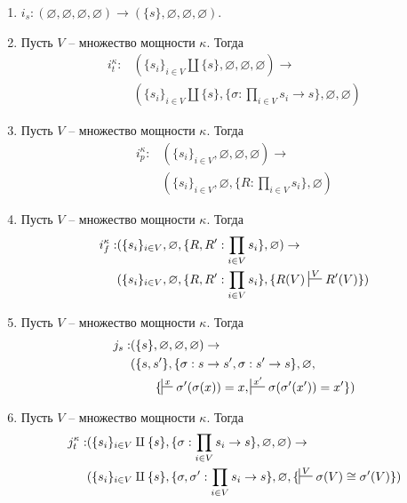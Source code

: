 \documentclass[reqno]{amsart}
\theoremstyle{definition}
\theoremstyle{remark}
\begin{document}
\begin{enumerate}
\item $i_s : (\varnothing,\varnothing,\varnothing,\varnothing) \to (\{ s \},\varnothing,\varnothing,\varnothing)$.
\item Пусть $V$ -- множество мощности $\kappa$. Тогда
\begin{align*}
i_t^\kappa : & (\{ s_i \}_{i \in V} \amalg \{ s \}, \varnothing, \varnothing, \varnothing) \to \\
             & (\{ s_i \}_{i \in V} \amalg \{ s \}, \{ \sigma : \prod_{i \in V} s_i \to s \}, \varnothing, \varnothing)
\end{align*}
\item Пусть $V$ -- множество мощности $\kappa$. Тогда
\begin{align*}
i_p^\kappa : & (\{ s_i \}_{i \in V}, \varnothing, \varnothing, \varnothing) \to \\
             & (\{ s_i \}_{i \in V}, \varnothing, \{ R : \prod_{i \in V} s_i \}, \varnothing)
\end{align*}
\item Пусть $V$ -- множество мощности $\kappa$. Тогда
\begin{align*}
i_f^\kappa : & (\{ s_i \}_{i \in V}, \varnothing, \{ R, R' : \prod_{i \in V} s_i \}, \varnothing) \to \\
             & (\{ s_i \}_{i \in V}, \varnothing, \{ R, R' : \prod_{i \in V} s_i \}, \{ R(V) \sststile{}{V} R'(V) \})
\end{align*}
\item Пусть $V$ -- множество мощности $\kappa$. Тогда
\begin{align*}
j_s : & (\{ s \},\varnothing,\varnothing,\varnothing) \to \\
      & (\{ s, s' \}, \{ \sigma : s \to s', \sigma : s' \to s \}, \varnothing, \\
      & \qquad \{ \sststile{}{x} \sigma'(\sigma(x)) = x, \sststile{}{x'} \sigma(\sigma'(x')) = x' \})
\end{align*}
\item Пусть $V$ -- множество мощности $\kappa$. Тогда
\begin{align*}
j_t^\kappa : & (\{ s_i \}_{i \in V} \amalg \{ s \}, \{ \sigma : \prod_{i \in V} s_i \to s \}, \varnothing, \varnothing) \to \\
             & (\{ s_i \}_{i \in V} \amalg \{ s \}, \{ \sigma, \sigma' : \prod_{i \in V} s_i \to s \}, \varnothing, \{ \sststile{}{V} \sigma(V) \cong \sigma'(V) \})
\end{align*}

\end{enumerate}
\end{document}
